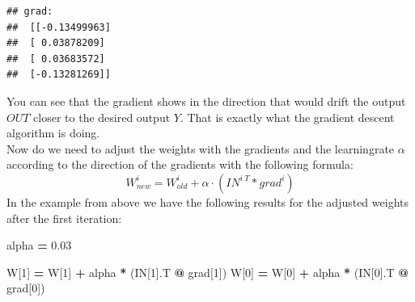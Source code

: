 \documentclass[
]{book}
\newenvironment{Shaded}{\begin{snugshade}}{\end{snugshade}}
\newcommand{\DecValTok}[1]{\textcolor[rgb]{0.00,0.00,0.81}{#1}}
\newcommand{\FloatTok}[1]{\textcolor[rgb]{0.00,0.00,0.81}{#1}}
\newcommand{\NormalTok}[1]{#1}
\newcommand{\OperatorTok}[1]{\textcolor[rgb]{0.81,0.36,0.00}{\textbf{#1}}}
\begin{document}
\begin{verbatim}
## grad: 
##  [[-0.13499963]
##  [ 0.03878209]
##  [ 0.03683572]
##  [-0.13281269]]
\end{verbatim}

You can see that the gradient shows in the direction that would drift the output \(OUT\) closer to the desired output \(Y\). That is exactly what the gradient descent algorithm is doing.\\
Now do we need to adjust the weights with the gradients and the learningrate \(\alpha\) according to the direction of the gradients with the following formula:
\[
  W^i_{new} = W^i_{old} + \alpha \cdot ( IN^{i\ T} * grad^i) 
\]
In the example from above we have the following results for the adjusted weights after the first iteration:

\begin{Shaded}
\begin{Highlighting}[]
\NormalTok{alpha }\OperatorTok{=} \FloatTok{0.03}

\NormalTok{W[}\DecValTok{1}\NormalTok{] }\OperatorTok{=}\NormalTok{ W[}\DecValTok{1}\NormalTok{] }\OperatorTok{+}\NormalTok{ alpha }\OperatorTok{*}\NormalTok{ (IN[}\DecValTok{1}\NormalTok{].T }\OperatorTok{@}\NormalTok{ grad[}\DecValTok{1}\NormalTok{]) }
\NormalTok{W[}\DecValTok{0}\NormalTok{] }\OperatorTok{=}\NormalTok{ W[}\DecValTok{0}\NormalTok{] }\OperatorTok{+}\NormalTok{ alpha }\OperatorTok{*}\NormalTok{ (IN[}\DecValTok{0}\NormalTok{].T }\OperatorTok{@}\NormalTok{ grad[}\DecValTok{0}\NormalTok{]) }
\end{Highlighting}
\end{Shaded}
\end{document}
